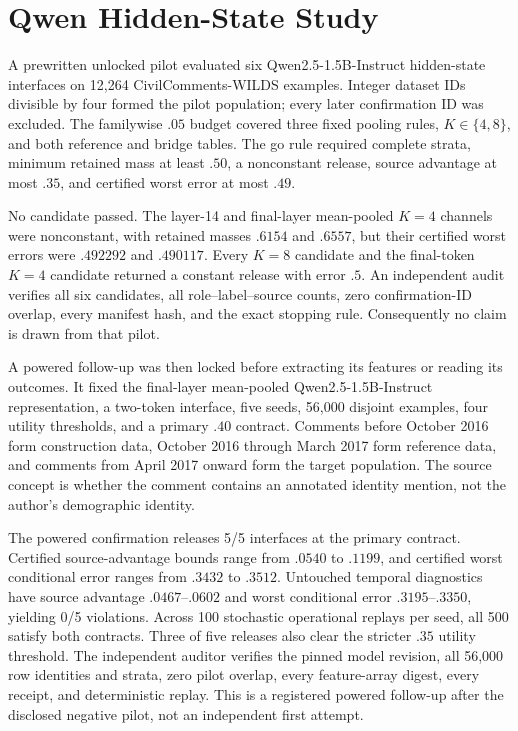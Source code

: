 











\section{Qwen Hidden-State Study}

A prewritten unlocked pilot evaluated six Qwen2.5-1.5B-Instruct hidden-state
interfaces on 12,264 CivilComments-WILDS examples. Integer dataset IDs divisible
by four formed the pilot population; every later confirmation ID was excluded.
The familywise $.05$ budget covered three fixed pooling rules, $K\in\{4,8\}$,
and both reference and bridge tables. The go rule required complete strata,
minimum retained mass at least $.50$, a nonconstant release, source advantage
at most $.35$, and certified worst error at most $.49$.

No candidate passed. The layer-14 and final-layer mean-pooled $K=4$ channels
were nonconstant, with retained masses $.6154$ and $.6557$, but their certified
worst errors were $.492292$ and $.490117$. Every $K=8$ candidate and the
final-token $K=4$ candidate returned a constant release with error $.5$. An
independent audit verifies all six candidates, all role--label--source counts,
zero confirmation-ID overlap, every manifest hash, and the exact stopping rule.
Consequently no claim is drawn from that pilot.

A powered follow-up was then locked before extracting its features or reading
its outcomes. It fixed the final-layer mean-pooled Qwen2.5-1.5B-Instruct
representation, a two-token interface, five seeds, 56,000 disjoint examples,
four utility thresholds, and a primary $.40$ contract. Comments before October
2016 form construction data, October 2016 through March 2017 form reference
data, and comments from April 2017 onward form the target population. The
source concept is whether the comment contains an annotated identity mention,
not the author's demographic identity.

The powered confirmation releases 5/5 interfaces at the primary contract.
Certified source-advantage bounds range from $.0540$ to $.1199$, and certified
worst conditional error ranges from $.3432$ to $.3512$. Untouched temporal
diagnostics have source advantage $.0467$--$.0602$ and worst conditional error
$.3195$--$.3350$, yielding 0/5 violations. Across 100 stochastic operational
replays per seed, all 500 satisfy both contracts. Three of five releases also
clear the stricter $.35$ utility threshold. The independent auditor verifies
the pinned model revision, all 56,000 row identities and strata, zero pilot
overlap, every feature-array digest, every receipt, and deterministic replay.
This is a registered powered follow-up after the disclosed negative pilot, not
an independent first attempt.

